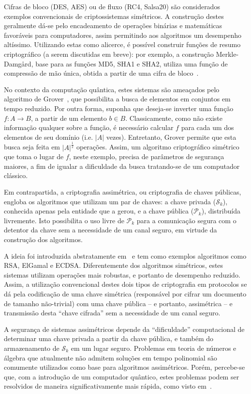 \documentclass[12pt]{report}
\newcommand{\pk}{\mathcal{P}_k}
\newcommand{\sk}{\mathcal{S}_k}
\newcommand{\length}[1]{\vert #1 \vert}
\begin{document}
Cifras de bloco (DES, AES) ou de fluxo (RC4, Salsa20) são
considerados exemplos convencionais de criptossistemas simétricos.
A construção destes geralmente dá-se pelo encadeamento de operações
binárias e matemáticas favoráveis para computadores, assim permitindo
aos algoritmos um desempenho altíssimo. Utilizando estas como alicerce,
é possível construir funções de resumo criptográfico (a serem discutidas
em breve): por exemplo, a construção Merkle-Damgård, base para as funções
MD5, SHA1 e SHA2, utiliza uma função de compressão de mão única, obtida
a partir de uma cifra de bloco~\cite[9.41]{Menezes:1996:HAC:548089}.

No contexto da computação quântica, estes sistemas são ameaçados
pelo algoritmo de Grover~\cite{Grover:1996:FQM:237814.237866}, que
possibilita a busca de elementos em conjuntos em tempo reduzido.
Por outra forma, suponha que deseja-se inverter uma função $f : A
\longrightarrow B$, a partir de um elemento $b \in B$. Classicamente,
como não existe informação qualquer sobre a função, é necessário
calcular $f$ para cada um dos elementos de seu domínio (i.e. $\length{A}$
vezes). Entretanto, Grover permite que esta busca seja feita em
$\length{A}^{\frac{1}{2}}$ operações. Assim, um algoritmo criptográfico simétrico
que toma o lugar de $f$, neste exemplo, precisa de parâmetros de segurança
maiores, a fim de igualar a dificuldade da busca tratando-se de um
computador clássico.

Em contrapartida, a criptografia assimétrica, ou criptografia de chaves
públicas, engloba os algoritmos que utilizam um par de chaves: a chave privada
($\sk{}$), conhecida apenas pela entidade que a gerou, e a chave pública
($\pk{}$), distribuída livremente. Isto possibilita o uso livre de $\pk{}$ para
a comunicação segura com o detentor da chave sem a necessidade de um canal
seguro, em virtude da construção dos algoritmos.

A ideia foi introduzida abstratamente em~\cite{Diffie:2006:NDC:2263321.2269104}
e tem como exemplos algoritmos como RSA, ElGamal e ECDSA.
Diferentemente dos algoritmos simétricos, estes sistemas utilizam operações
mais robustas, e portanto de desempenho reduzido. Assim, a utilização
convencional destes dois tipos de criptografia em protocolos se dá pela
codificação de uma chave simétrica (responsável por cifrar um documento
de tamanho não-trivial) com uma chave pública -- e portanto,
assimétrica -- e transmissão desta ``chave cifrada'' sem a necessidade de
um canal seguro.

A segurança de sistemas assimétricos depende da ``dificuldade''
computacional de determinar uma chave privada a partir da chave pública,
e também do armazenamento de $\sk{}$ em um lugar seguro. Problemas em
teoria de números e álgebra que atualmente não admitem soluções em tempo
polinomial são comumente utilizados como base para algoritmos assimétricos.
Porém, percebe-se que, com a introdução de um computador quântico, estes
problemas podem ser resolvidos de maneira significativamente mais rápida,
como visto em~\cite{Shor:1997:PAP:264393.264406}.
\end{document}
